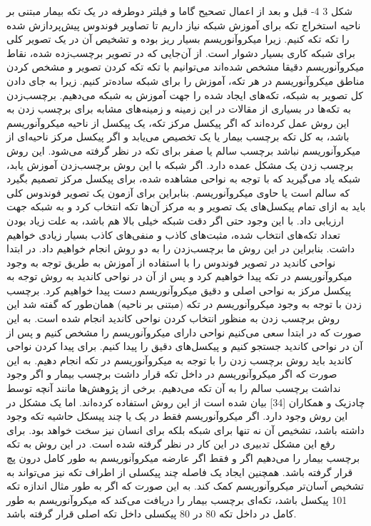 شکل ‏3 4- قبل و بعد از اعمال تصحیح گاما و فیلتر دوطرفه در یک تکه بیمار مبتنی بر ناحیه
استخراج تکه
برای آموزش شبکه نیاز داریم تا تصاویر فوندوس پیش‌پردازش شده را تکه تکه کنیم. زیرا میکروآنوریسم بسیار ریز بوده و تشخیص آن در یک تصویر کلی برای شبکه کاری بسیار دشوار است. از آن‌جایی که در تصویر برچسب‌زده شده، نقاط میکروآنوریسم دقیقا مشخص شده‌اند می‌توانیم با تکه تکه کردن تصویر و مشخص کردن مناطق میکروآنوریسم در هر تکه، آموزش را برای شبکه ساده‌تر کنیم. زیرا به جای دادن کل تصویر به شبکه، تکه‌های ایجاد شده را جهت آموزش به شبکه می‌دهیم.
برچسب‌زدن به تکه‌ها
در بسیاری از مقالات در این زمینه و زمینه‌های مشابه برای برچسب زدن به این روش عمل کرده‌اند که اگر پیکسل مرکز تکه، یک پیکسل از ناحیه میکروآنوریسم باشد، به کل تکه برچسب بیمار یا یک تخصیص می‌یابد و اگر پیکسل مرکز ناحیه‌ای از میکروآنوریسم نباشد برچسب سالم یا صفر برای تکه در نظر گرفته می‌شود. این روش برچسب زدن یک مشکل عمده دارد. اگر شبکه با این روش برچسب‌زدن آموزش یابد، شبکه یاد می‌گیرید که با توجه به نواحی مشاهده شده، برای پیکسل مرکز تصمیم بگیرد که سالم است یا حاوی میکروآنوریسم. بنابراین برای آزمون یک تصویر فوندوس کلی باید به ازای تمام پیکسل‌های یک تصویر و به مرکز آن‌ها تکه انتخاب کرد و به شبکه جهت ارزیابی داد. با این وجود حتی اگر دقت شبکه خیلی بالا هم باشد، به علت زیاد بودن تعداد تکه‌های انتخاب شده، مثبت‌های کاذب و منفی‌های کاذب بسیار زیادی خواهیم داشت.
بنابراین در این روش ما برچسب‌زدن را به دو روش انجام خواهیم داد. در ابتدا نواحی کاندید در تصویر فوندوس را با استفاده از آموزش به طریق توجه به وجود میکروآنوریسم در تکه پیدا خواهیم کرد و پس از آن در نواحی کاندید به روش توجه به پیکسل مرکز به نواحی اصلی و دقیق میکروآنوریسم دست پیدا خواهیم کرد.
برچسب ‌زدن با توجه به وجود میکروآنوریسم در تکه (مبتنی بر ناحیه)
همان‌طور که گفته شد این روش برچسب زدن به منظور انتخاب کردن نواحی کاندید انجام شده است. به این صورت که در ابتدا سعی می‌کنیم نواحی دارای میکروآنوریسم را مشخص کنیم و پس از آن در نواحی کاندید جستجو کنیم و پیکسل‌های دقیق را پیدا کنیم. برای پیدا کردن نواحی کاندید باید روش برچسب زدن را با توجه به میکروآنوریسم در تکه انجام دهیم. به این صورت که اگر میکروآنوریسم در داخل تکه قرار داشت برچسب بیمار و اگر وجود نداشت برچسب سالم را به آن تکه می‌دهیم. برخی از پژوهش‌ها مانند آنچه توسط چادزیک  و همکاران [34] بیان شده است از این روش استفاده کرده‌اند. اما یک مشکل در این روش وجود دارد. اگر میکروآنوریسم فقط در یک یا چند پیسکل حاشیه تکه وجود داشته باشد، تشخیص آن نه تنها برای شبکه بلکه برای انسان نیز سخت خواهد بود.
برای رفع این مشکل تدبیری در این کار در نظر گرفته شده است. در این روش به تکه برچسب بیمار را می‌دهیم اگر و فقط اگر عارضه میکروآنوریسم به طور کامل درون پچ قرار گرفته باشد. همچنین ایجاد یک فاصله چند پیکسلی از اطراف تکه نیز می‌تواند به تشخیص آسان‌تر میکروآنوریسم کمک کند. به این صورت که اگر به طور مثال اندازه تکه 101 پیکسل باشد، تکه‌ای برچسب بیمار را دریافت می‌کند که میکروآنوریسم به طور کامل در داخل تکه 80 در 80 پیکسلی داخل تکه اصلی قرار گرفته باشد.
